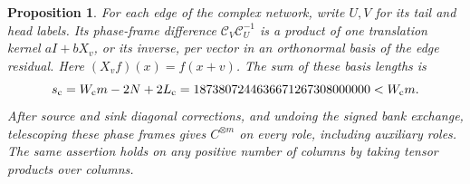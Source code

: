 \documentclass[11pt]{article}
\newtheorem{proposition}[theorem]{Proposition}
\theoremstyle{definition}
\begin{document}
\begin{proposition}\label{prop:complex-motif-interface}
For each edge of the complex network, write $U,V$ for its tail and
head labels.  Its phase-frame difference
$\mathcal C_V\mathcal C_U^{-1}$ is a product of one translation
kernel $aI+bX_v$, or its inverse, per vector in an orthonormal basis
of the edge residual.  Here $(X_vf)(x)=f(x+v)$.
The sum of these basis lengths is
\[
 s_{\rm c}=W_{\rm c}m-2N+2L_{\rm c}
 =1873807244636671267308000000<W_{\rm c}m.
\]
After source and sink diagonal corrections, and undoing the signed
bank exchange, telescoping these phase frames gives $C^{\otimes m}$
on every role, including auxiliary roles.  The same assertion holds
on any positive number of columns by taking tensor products over columns.
\end{proposition}
\end{document}
